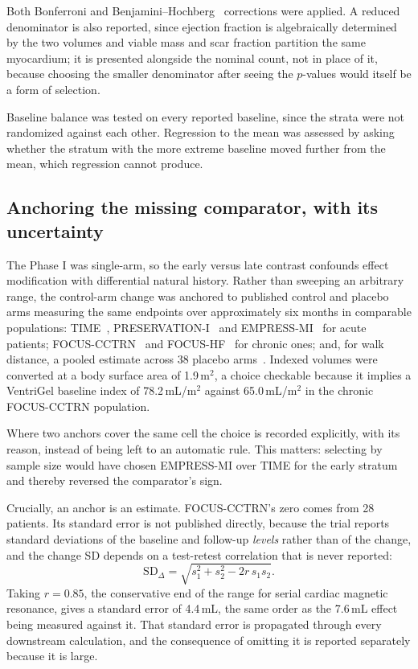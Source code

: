 \documentclass[10pt,twocolumn,letterpaper]{article}
\begin{document}
Both Bonferroni and Benjamini--Hochberg~\cite{benjamini1995} corrections were applied. A reduced
denominator is also reported, since ejection fraction is algebraically determined by the two volumes
and viable mass and scar fraction partition the same myocardium; it is presented alongside the
nominal count, not in place of it, because choosing the smaller denominator after seeing the
$p$-values would itself be a form of selection.

Baseline balance was tested on every reported baseline, since the strata were not randomized against
each other. Regression to the mean was assessed by asking whether the stratum with the more extreme
baseline moved further from the mean, which regression cannot produce.

\subsection{Anchoring the missing comparator, with its uncertainty}

The Phase I was single-arm, so the early versus late contrast confounds effect modification with
differential natural history. Rather than sweeping an arbitrary range, the control-arm change was
anchored to published control and placebo arms measuring the same endpoints over approximately six
months in comparable populations: TIME~\cite{traverse2012}, PRESERVATION-I~\cite{rao2016} and
EMPRESS-MI~\cite{carberry2025} for acute patients; FOCUS-CCTRN~\cite{perin2012} and
FOCUS-HF~\cite{perin2011} for chronic ones; and, for walk distance, a pooled estimate across 38
placebo arms~\cite{khan2022}. Indexed volumes were converted at a body surface area of
1.9\,m$^2$, a choice checkable because it implies a VentriGel baseline index of 78.2\,mL/m$^2$
against 65.0\,mL/m$^2$ in the chronic FOCUS-CCTRN population.

Where two anchors cover the same cell the choice is recorded explicitly, with its reason, instead of
being left to an automatic rule. This matters: selecting by sample size would have chosen EMPRESS-MI over
TIME for the early stratum and thereby reversed the comparator's sign.

Crucially, an anchor is an estimate. FOCUS-CCTRN's zero comes from 28 patients. Its standard error is
not published directly, because the trial reports standard deviations of the baseline and follow-up
\emph{levels} rather than of the change, and the change SD depends on a test-retest correlation that
is never reported:
\begin{equation}
\mathrm{SD}_{\Delta}=\sqrt{s_1^2+s_2^2-2r\,s_1 s_2}.
\end{equation}
Taking $r=0.85$, the conservative end of the range for serial cardiac magnetic resonance, gives a
standard error of 4.4\,mL, the same order as the 7.6\,mL effect being measured against it. That
standard error is propagated through every downstream calculation, and the consequence of omitting
it is reported separately because it is large.
\end{document}
